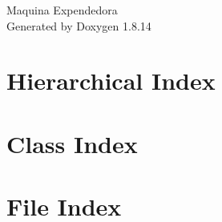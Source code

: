 \documentclass[twoside]{book}
\newcommand{\+}{\discretionary{\mbox{\scriptsize$\hookleftarrow$}}{}{}}
\newcommand{\clearemptydoublepage}{%
  \newpage{\pagestyle{empty}\cleardoublepage}%
}
\begin{document}
\hypersetup{pageanchor=false,
             bookmarksnumbered=true,
             pdfencoding=unicode
            }
\begin{titlepage}
\vspace*{7cm}
\begin{center}%
{\Large Maquina Expendedora }\\
\vspace*{1cm}
{\large Generated by Doxygen 1.8.14}\\
\end{center}
\end{titlepage}
\clearemptydoublepage
{}
\tableofcontents
\clearemptydoublepage
{}
\hypersetup{pageanchor=true}

\chapter{Hierarchical Index}

\chapter{Class Index}

\chapter{File Index}

\end{document}
